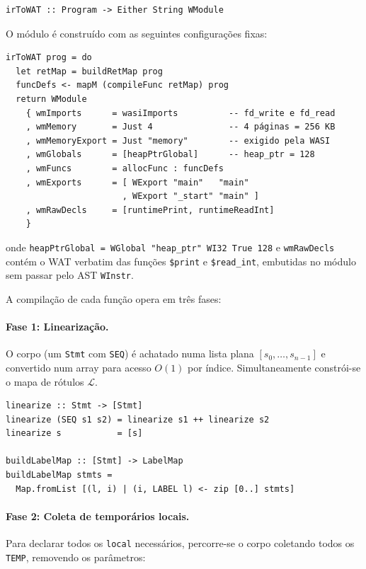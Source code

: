 \begin{verbatim}
irToWAT :: Program -> Either String WModule
\end{verbatim}

O módulo é construído com as seguintes configurações fixas:

\begin{verbatim}
irToWAT prog = do
  let retMap = buildRetMap prog
  funcDefs <- mapM (compileFunc retMap) prog
  return WModule
    { wmImports      = wasiImports          -- fd_write e fd_read
    , wmMemory       = Just 4               -- 4 páginas = 256 KB
    , wmMemoryExport = Just "memory"        -- exigido pela WASI
    , wmGlobals      = [heapPtrGlobal]      -- heap_ptr = 128
    , wmFuncs        = allocFunc : funcDefs
    , wmExports      = [ WExport "main"   "main"
                       , WExport "_start" "main" ]
    , wmRawDecls     = [runtimePrint, runtimeReadInt]
    }
\end{verbatim}

\noindent onde \texttt{heapPtrGlobal = WGlobal "heap\_ptr" WI32 True 128} e
\texttt{wmRawDecls} contém o WAT verbatim das funções \texttt{\$print} e
\texttt{\$read\_int}, embutidas no módulo sem passar pelo AST \texttt{WInstr}.

A compilação de cada função opera em três fases:

\paragraph{Fase 1: Linearização.}
O corpo (um \texttt{Stmt} com \texttt{SEQ}) é achatado numa lista plana
$[s_0, \ldots, s_{n-1}]$ e convertido num array para acesso $O(1)$ por índice.
Simultaneamente constrói-se o mapa de rótulos $\mathcal{L}$.

\begin{verbatim}
linearize :: Stmt -> [Stmt]
linearize (SEQ s1 s2) = linearize s1 ++ linearize s2
linearize s           = [s]

buildLabelMap :: [Stmt] -> LabelMap
buildLabelMap stmts =
  Map.fromList [(l, i) | (i, LABEL l) <- zip [0..] stmts]
\end{verbatim}

\paragraph{Fase 2: Coleta de temporários locais.}
Para declarar todos os \texttt{local} necessários, percorre-se o corpo
coletando todos os \texttt{TEMP}, removendo os parâmetros:

